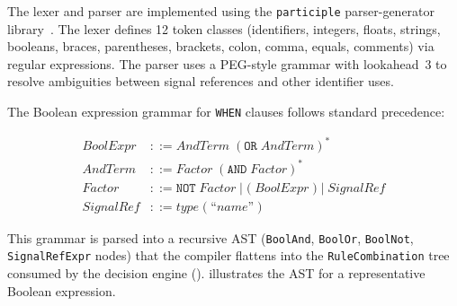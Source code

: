 The lexer and parser are implemented using the \texttt{participle} parser-generator library~\cite{participle2024}.
The lexer defines 12 token classes (identifiers, integers, floats, strings, booleans, braces, parentheses, brackets, colon, comma, equals, comments) via regular expressions.
The parser uses a PEG-style grammar with lookahead~3 to resolve ambiguities between signal references and other identifier uses.

The Boolean expression grammar for \texttt{WHEN} clauses follows standard precedence:

\begin{align}
  \textit{BoolExpr} &::= \textit{AndTerm} \;(\texttt{OR}\; \textit{AndTerm})^* \label{eq:bool_or} \\
  \textit{AndTerm} &::= \textit{Factor} \;(\texttt{AND}\; \textit{Factor})^* \label{eq:bool_and} \\
  \textit{Factor} &::= \texttt{NOT}\; \textit{Factor} \mid \texttt{(}\;\textit{BoolExpr}\;\texttt{)} \mid \textit{SignalRef} \label{eq:bool_factor} \\
  \textit{SignalRef} &::= \textit{type}\;\texttt{(}\;\textit{``name''}\;\texttt{)} \label{eq:signal_ref}
\end{align}

This grammar is parsed into a recursive AST (\texttt{BoolAnd}, \texttt{BoolOr}, \texttt{BoolNot}, \texttt{SignalRefExpr} nodes) that the compiler flattens into the \texttt{RuleCombination} tree consumed by the decision engine ().
 illustrates the AST for a representative Boolean expression.

